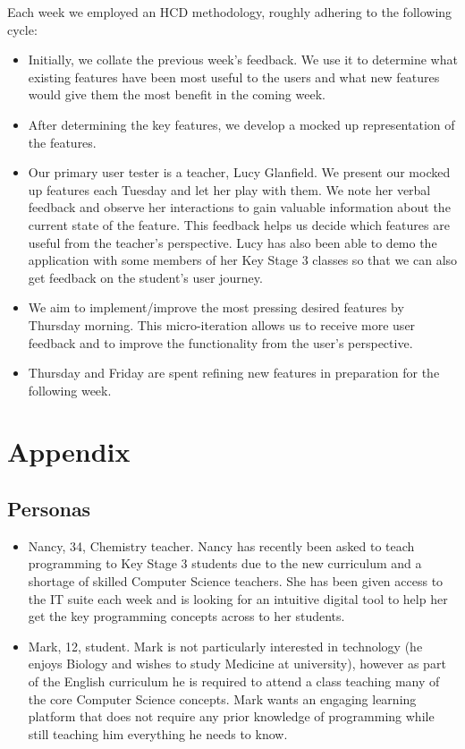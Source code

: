 \documentclass[a4wide, 11pt]{article}
\begin{document}
Each week we employed an HCD methodology, roughly adhering to the following cycle:

\begin{itemize}
  \item Initially, we collate the previous week's feedback. We use it to determine what existing features have been most useful to the users and what new features would give them the most benefit in the coming week.
  \item After determining the key features, we develop a mocked up representation of the features.
  \item Our primary user tester is a teacher, Lucy Glanfield. We present our mocked up features each Tuesday and let her play with them. We note her verbal feedback and observe her interactions to gain valuable information about the current state of the feature. This feedback helps us decide which features are useful from the teacher's perspective. Lucy has also been able to demo the application with some members of her Key Stage 3 classes so that we can also get feedback on the student's user journey.
  \item We aim to implement/improve the most pressing desired features by Thursday morning. This micro-iteration allows us to receive more user feedback and to improve the functionality from the user's perspective.
  \item Thursday and Friday are spent refining new features in preparation for the following week.
\end{itemize}

\section{Appendix}

\subsection{Personas}
\begin{itemize}
  \item Nancy, 34, Chemistry teacher. Nancy has recently been asked to teach programming
  to Key Stage 3 students due to the new curriculum and a shortage of skilled
  Computer Science teachers. She has been given access to the IT suite each week
  and is looking for an intuitive digital tool to help her get the key programming
  concepts across to her students.

  \item Mark, 12, student. Mark is not particularly interested in technology (he enjoys
  Biology and wishes to study Medicine at university), however as part of the English
  curriculum he is required to attend a class teaching many of the core
  Computer Science concepts. Mark wants an engaging learning platform that
  does not require any prior knowledge of programming while still teaching him
  everything he needs to know.
\end{itemize}
\end{document}
